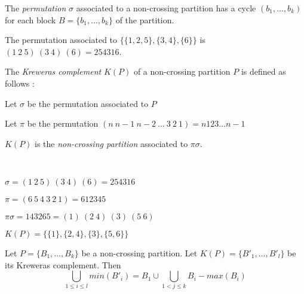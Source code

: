 \begin{definition}
    The \emph{permutation} $\sigma$ associated to a non-crossing
    partition has a cycle $(b_1, \ldots, b_k)$ for each block
    $B = \{b_1, \ldots, b_k\}$ of the partition.
\end{definition}

\begin{example}
    The permutation associated to $\{\{1, 2, 5\}, \{3, 4\}, \{6\}\}$
    is $(1\ 2\ 5)\ (3\ 4)\ (6) = 254316$.
\end{example}

\begin{definition}
    The \emph{Kreweras complement} $K (P)$ of a non-crossing
    partition $P$ is defined as follows :\\
    \begin{itemize*}
        \item Let $\sigma$ be the permutation associated to $P$\\
        \item Let $\pi$ be the permutation $(n\ n-1\ n-2\
        \ldots\ 3\ 2\ 1) = n123 \ldots n-1$\\
        \item $K (P)$ is the \emph{non-crossing partition}
        associated to $\pi \sigma$.\\
    \end{itemize*}
\end{definition}

\begin{example}[$P = \{\{1, 2, 5\}, \{3, 4\}, \{6\}\}$]
    ~\\
    \begin{itemize*}
        \item $\sigma = (1\ 2\ 5)\ (3\ 4)\ (6) = 254316$\\
        \item $\pi = (6\ 5\ 4\ 3\ 2\ 1) = 612345$\\
        \item $\pi \sigma = 143265 = (1)\ (2\ 4)\ (3)\ (5\ 6)$\\
        \item $K(P) = \{\{1\},\{2, 4\}, \{3\}, \{5, 6\}\}$\\
    \end{itemize*}
\end{example}

\begin{prop}
        Let $P = \{B_1, \ldots, B_k\}$ be a non-crossing partition.
        Let $K (P) = \{B'_1, \ldots, B'_l\}$ be its Kreweras complement.
        Then $$\bigcup_{1 \leq i \leq l}{min (B'_i)} =
        B_1 \cup \bigcup_{1 < j \leq k}{B_i - {max (B_i)}}$$\\
\end{prop}

